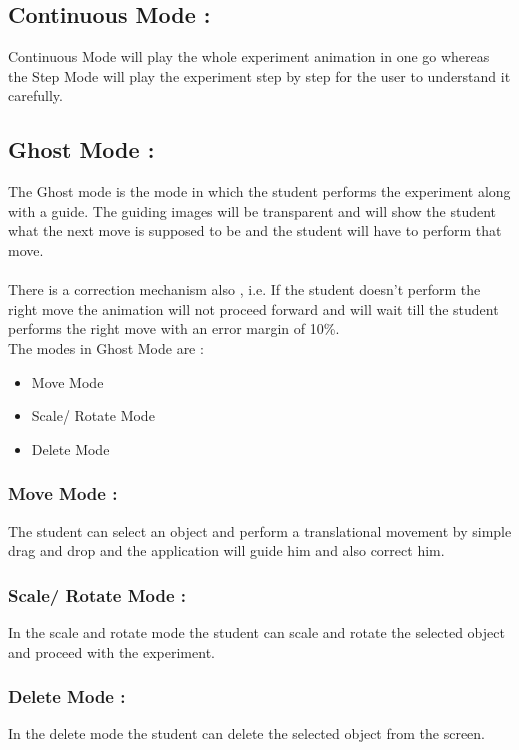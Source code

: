 \documentclass[12pt]{report}
\begin{document}
\subsection{Continuous Mode :}
Continuous Mode will play the whole experiment animation in one go whereas the Step Mode will 
play the experiment step by step for the user to understand it carefully. 


\subsection{Ghost Mode :}
The Ghost mode is the mode in which the student performs the experiment along with a guide. 
The guiding images will be transparent and will show the student what the next move is 
supposed to be and the student will have to perform that move.\\
\\
There is a correction mechanism also , i.e. If the student doesn't perform the right move the 
animation will not proceed forward and will wait till the student performs the right move with an 
error margin of 10\%. 
\\
The modes in Ghost Mode are :  
\begin{itemize}
\item Move Mode
\item Scale/ Rotate Mode
\item Delete Mode
\end{itemize}

\subsubsection{Move Mode :}
The student can select an object and perform a translational movement by simple drag and drop 
and the application will guide him and also correct him. 

\subsubsection{Scale/ Rotate Mode :}
In the scale and rotate mode the student can scale and rotate the selected object and proceed with the experiment. 

\subsubsection{Delete Mode :} 
In the delete mode the student can delete the selected object from the screen. \\
\end{document}
